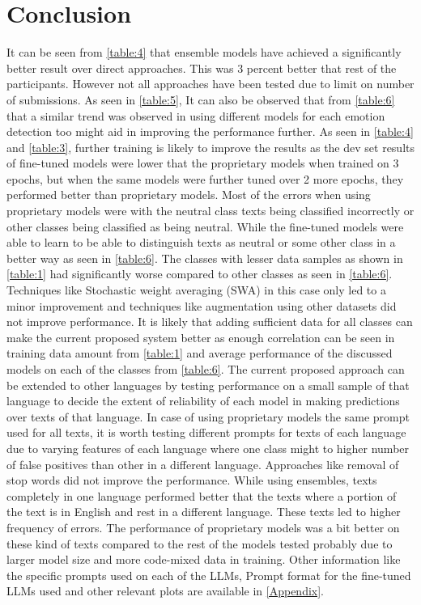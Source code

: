 \documentclass[11pt]{article}
\begin{document}
\section{Conclusion}
It can be seen from \autoref{table:4} that ensemble models have achieved a significantly better result over direct approaches. This was 3 percent better that rest of the participants. However not all approaches have been tested due to limit on number of submissions. As seen in \autoref{table:5}, It can also be observed that from \autoref{table:6} that a similar trend was observed in using different models for each emotion detection too might aid in improving the performance further. As seen in \autoref{table:4} and \autoref{table:3}, further training is likely to improve the results as the dev set results of fine-tuned models were lower that the proprietary models when trained on 3 epochs, but when the same models were further tuned over 2 more epochs, they performed better than proprietary models. Most of the errors when using proprietary models were with the neutral class texts being classified incorrectly or other classes being classified as being neutral. While the fine-tuned models were able to learn to be able to distinguish texts as neutral or some other class in a better way as seen in \autoref{table:6}. The classes with lesser data samples as shown in \autoref{table:1} had significantly worse compared to other classes as seen in \autoref{table:6}. Techniques like Stochastic weight averaging (SWA)\citep{izmailov2019averaging} in this case only led to a minor improvement and techniques like augmentation using other datasets did not improve performance. It is likely that adding sufficient data for all classes can make the current proposed system better as enough correlation can be seen in training data amount from \autoref{table:1} and average performance of the discussed models on each of the classes from \autoref{table:6}.  The current proposed approach can be extended to other languages by testing performance on a small sample of that language to decide the extent of reliability of each model in making predictions over texts of that language. In case of using proprietary models the same prompt used for all texts, it is worth testing different prompts for texts of each language due to varying features of each language where one class might to higher number of false positives than other in a different language. Approaches like removal of stop words did not improve the performance. While using ensembles, texts completely in one language performed better that the texts where a portion of the text is in English and rest in a different language. These texts led to higher frequency of errors. The performance of proprietary models was a bit better on these kind of texts compared to the rest of the models tested probably due to larger model size and more code-mixed data in training. Other information like the specific prompts used on each of the LLMs, Prompt format for the fine-tuned LLMs used and other relevant plots are available in \autoref{Appendix}. 
\end{document}
